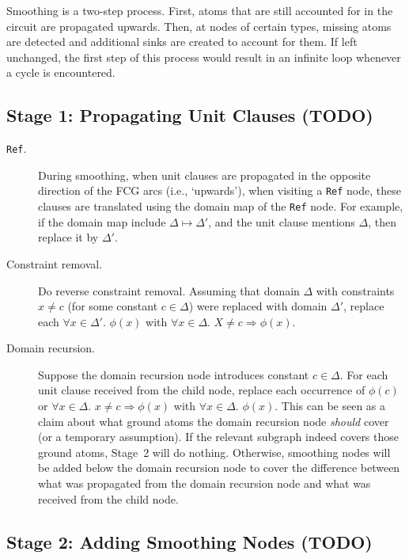 \documentclass{article}
\theoremstyle{definition}
\begin{document}
Smoothing is a two-step process. First, atoms that are still accounted for in
the circuit are propagated upwards. Then, at nodes of certain types, missing
atoms are detected and additional sinks are created to account for them. If left
unchanged, the first step of this process would result in an infinite loop
whenever a cycle is encountered.


\subsection{Stage 1: Propagating Unit Clauses (TODO)}\label{sec:smoothingfcg2}

\begin{description}
  \item[\texttt{Ref}.] During smoothing, when unit clauses are propagated in the
        opposite direction of the FCG arcs (i.e., `upwards'), when visiting a
        \texttt{Ref} node, these clauses are translated using the domain map of
        the \texttt{Ref} node. For example, if the domain map include
        $\Delta \mapsto \Delta'$, and the unit clause mentions $\Delta$, then
        replace it by $\Delta'$.
  \item[Constraint removal.] Do reverse constraint removal. Assuming that
        domain $\Delta$ with constraints $x \ne c$ (for some constant
        $c \in \Delta$) were replaced with domain $\Delta'$, replace each
        $\forall x \in \Delta'\text{. }\phi(x)$ with
        $\forall x \in \Delta\text{. }X \ne c \Rightarrow \phi(x)$.
  \item[Domain recursion.] Suppose the domain recursion node introduces constant
        $c \in \Delta$. For each unit clause received from the child node,
        replace each occurrence of $\phi(c)$ or $\forall x \in \Delta\text{.
        } x \ne c \Rightarrow \phi(x)$ with $\forall x \in \Delta\text{.
        }\phi(x)$. This can be seen as a claim about what ground atoms the
        domain recursion node \emph{should} cover (or a temporary assumption).
        If the relevant subgraph indeed covers those ground atoms, Stage~2 will
        do nothing. Otherwise, smoothing nodes will be added below the domain
        recursion node to cover the difference between what was propagated from
        the domain recursion node and what was received from the child node.
\end{description}

\subsection{Stage 2: Adding Smoothing Nodes (TODO)}\label{sec:smoothingfcg3}
\end{document}
